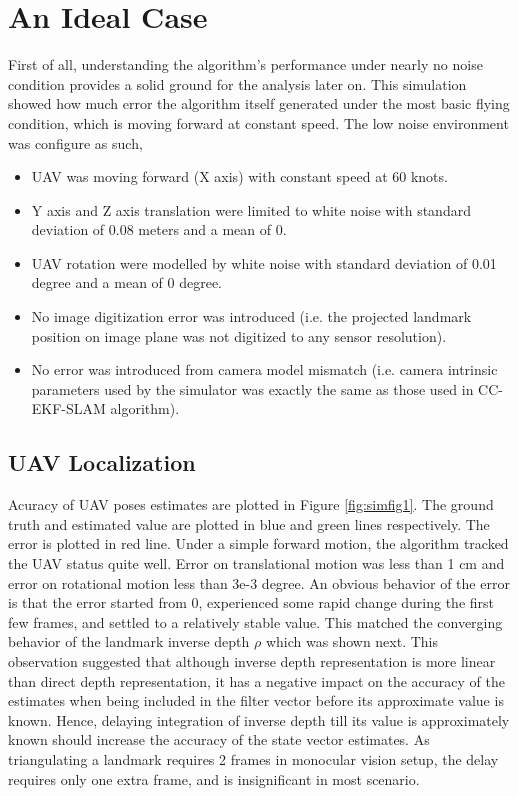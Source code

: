 \section{An Ideal Case}
First of all, understanding the algorithm's performance under nearly
no noise condition provides a solid ground for the analysis later on.
This simulation showed how much error the algorithm itself generated under
the most basic flying condition, which is moving forward at constant
speed. The low noise environment was configure as such,

\begin{itemize}
  \item UAV was moving forward (X axis) with constant speed at 60 knots. 
  \item Y axis and Z axis translation were limited to white noise with
  standard deviation of 0.08 meters and a mean of 0.
  \item UAV rotation were modelled by white noise with standard
  deviation of 0.01 degree and a mean of 0 degree.
  \item No image digitization error was introduced (i.e. the projected
  landmark position on image plane was not digitized to any sensor
  resolution).
  \item No error was introduced from camera model mismatch (i.e.
  camera intrinsic parameters used by the simulator was exactly the
  same as those used in CC-EKF-SLAM algorithm).
\end{itemize}

\subsection{UAV Localization}
Acuracy of UAV poses estimates are plotted in Figure
\ref{fig:simfig1}. The ground truth and estimated value are plotted
in blue and green lines respectively. The error is plotted in red
line. Under a simple forward motion, the algorithm tracked the
UAV status quite well. Error on translational motion was less than 1
cm and error on rotational motion less than 3e-3 degree. An obvious
behavior of the error is that the error started from 0, experienced
some rapid change during the first few frames, and settled to a
relatively stable value. This matched the converging behavior of the
landmark inverse depth $\rho$ which was shown next. This observation
suggested that although inverse depth representation is more linear
than direct depth representation, it has a negative impact on the
accuracy of the estimates when being included in the filter vector
before its approximate value is known. Hence, delaying integration of
inverse depth till its value is approximately known should increase
the accuracy of the state vector estimates. As triangulating a
landmark requires 2 frames in monocular vision setup, the delay
requires only one extra frame, and is insignificant in most scenario.

